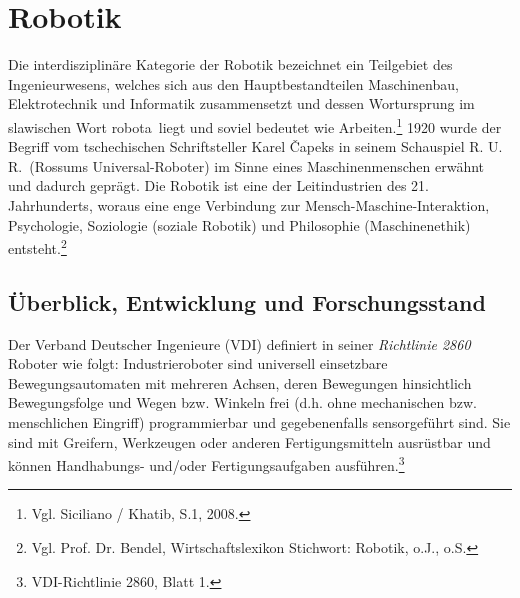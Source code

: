 \section{Robotik}\label{sec:robots}
Die interdisziplinäre Kategorie der Robotik bezeichnet ein Teilgebiet des Ingenieurwesens, welches sich aus den Hauptbestandteilen Maschinenbau, Elektrotechnik und Informatik zusammensetzt und dessen Wortursprung im slawischen Wort \frqq robota\flqq\ liegt und soviel bedeutet wie \frqq Arbeiten\flqq.\footnote{ Vgl. Siciliano / Khatib, S.1, 2008.} 1920 wurde der Begriff vom tschechischen Schriftsteller Karel Čapeks in seinem Schauspiel \frqq R. U. R.\flqq\ (Rossums Universal-Roboter) im Sinne eines Maschinenmenschen erwähnt und dadurch geprägt. Die Robotik ist eine der Leitindustrien des 21. Jahrhunderts, woraus eine enge Verbindung zur Mensch-Maschine-Interaktion, Psychologie, Soziologie (soziale Robotik) und Philosophie (Maschinenethik) entsteht.\footnote{ Vgl. Prof. Dr. Bendel, Wirtschaftslexikon Stichwort: Robotik, o.J., o.S.}
\subsection{Überblick, Entwicklung und Forschungsstand}\label{ssec:researchRobots}
Der Verband Deutscher Ingenieure (VDI) definiert in seiner \textit{Richtlinie 2860} Roboter wie folgt: \frqq Industrieroboter sind universell einsetzbare Bewegungsautomaten mit mehreren Achsen, deren Bewegungen hinsichtlich Bewegungsfolge und Wegen bzw. Winkeln frei (d.h. ohne mechanischen bzw. menschlichen Eingriff) programmierbar und gegebenenfalls sensorgeführt sind. Sie sind mit Greifern, Werkzeugen oder anderen Fertigungsmitteln ausrüstbar und können Handhabungs- und/oder Fertigungsaufgaben ausführen\flqq.\footnote{ VDI-Richtlinie 2860, Blatt 1.}

